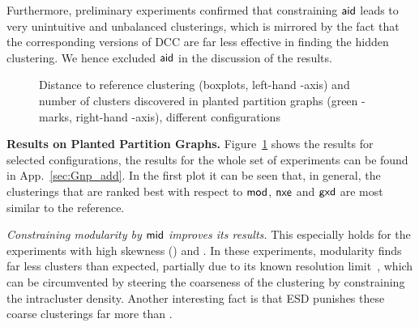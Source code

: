 \documentclass{llncs}
\newcommand{\measure}[1]{\ensuremath{\text{\normalfont{\sffamily {#1}}}}\xspace}
\newcommand{\andreapar}{\vspace*{.5ex}\par\noindent}
\begin{document}
Furthermore, preliminary experiments confirmed that constraining \measure{aid} leads to very unintuitive and unbalanced clusterings, which is mirrored by the fact that the corresponding versions of \textsc{DCC} are far less effective in finding the hidden clustering.
We hence excluded \measure{aid} in the discussion of the results.
\begin{figure}[htbp]
\hfill \vspace{0.1cm}
  \hfill \vspace{0.1cm}
  \hfill \vspace{0.1cm}
  \vspace*{-1ex}
  \caption{Distance to reference clustering (boxplots, left-hand -axis) and number of clusters discovered in planted partition graphs (green -marks, right-hand -axis), different configurations}\label{fig:Gnp}\end{figure}
\andreapar\textbf{Results on Planted Partition Graphs.}
Figure~\ref{fig:Gnp} shows the results for selected configurations, the results for the whole set of experiments can be found in App.~\ref{sec:Gnp_add}.
In the first plot it can be seen that, in general, the clusterings that are ranked best with respect to \measure{mod}, \measure{nxe} and \measure{gxd} are most similar to the reference. \par\emph{Constraining modularity by \measure{mid} improves its results.}
This especially holds for the experiments with high skewness () and .
In these experiments, modularity finds far less clusters than expected, partially due to its known resolution limit~\cite{bf-rlcd-07}, which can be circumvented by steering the coarseness of the clustering by constraining the intracluster density.
Another interesting fact is that ESD punishes these coarse clusterings far more than . 
\end{document}
